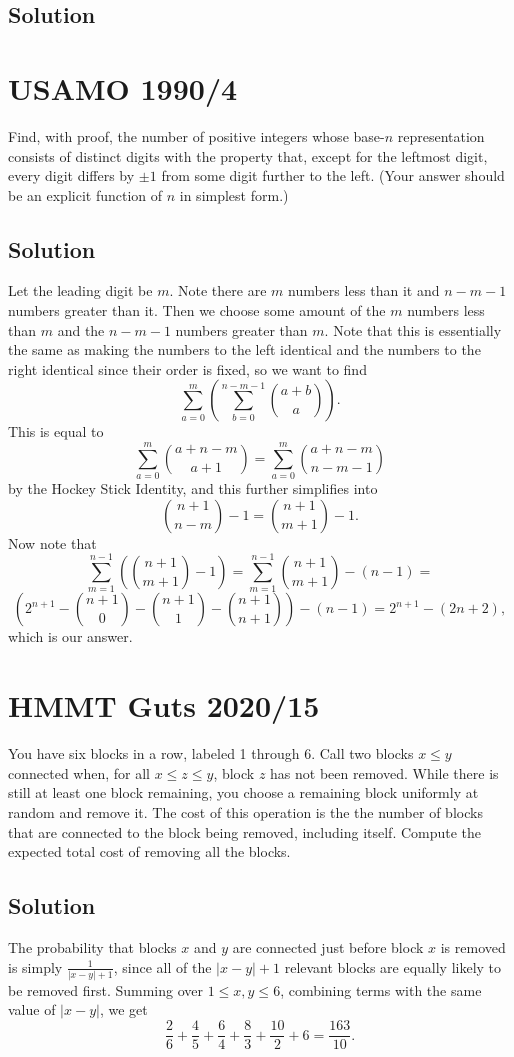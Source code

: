 \documentclass{article}
\begin{document}
\subsection{Solution}

\pagebreak\section{USAMO 1990/4}
Find, with proof, the number of positive integers whose base-$n$ representation consists of distinct digits with the property that, except for the leftmost digit, every digit differs by $\pm 1$ from some digit further to the left. (Your answer should be an explicit function of $n$ in simplest form.)

\subsection{Solution}

Let the leading digit be $m.$ Note there are $m$ numbers less than it and $n-m-1$ numbers greater than it. Then we choose some amount of the $m$ numbers less than $m$ and the $n-m-1$ numbers greater than $m.$ Note that this is essentially the same as making the numbers to the left identical and the numbers to the right identical since their order is fixed, so we want to find
\[\sum_{a=0}^m\left(\sum_{b=0}^{n-m-1}\binom{a+b}{a}\right).\]This is equal to
\[\sum_{a=0}^m\binom{a+n-m}{a+1}=\sum_{a=0}^m\binom{a+n-m}{n-m-1}\]by the Hockey Stick Identity, and this further simplifies into
\[\binom{n+1}{n-m}-1=\binom{n+1}{m+1}-1.\]Now note that
\[\sum_{m=1}^{n-1}\left(\binom{n+1}{m+1}-1\right)=\sum_{m=1}^{n-1}\binom{n+1}{m+1}-(n-1)=\]
\[\left(2^{n+1}-\binom{n+1}{0}-\binom{n+1}{1}-\binom{n+1}{n+1}\right)-(n-1)=2^{n+1}-(2n+2),\]which is our answer.

\pagebreak\section{HMMT Guts 2020/15}
You have six blocks in a row, labeled 1 through 6. Call two blocks $x \le y$ connected when, for all $x \le z \le y$, block $z$ has not been removed. While there is still at least one block remaining, you choose a remaining block uniformly at random and remove it. The cost of this operation is the the number of blocks that are connected to the block being removed, including itself. Compute the expected total cost of removing all the blocks.
\subsection{Solution}
The probability that blocks $x$ and $y$ are connected just before block $x$ is removed is simply $\frac1{|x-y|+1}$, since
all of the $|x-y|+1$ relevant blocks are equally likely to be removed first. Summing over $1 \le x, y \le 6$,
combining terms with the same value of $|x-y|$, we get
$$\frac26 + \frac45 + \frac64 + \frac83 + \frac{10}2 + 6 = \frac{163}{10}.$$
\end{document}
